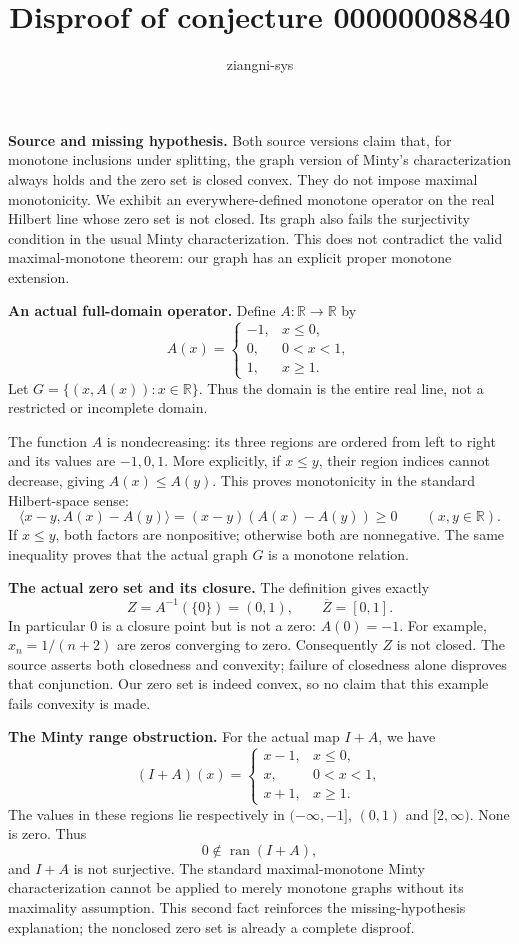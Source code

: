 \documentclass[11pt]{article}
\title{Disproof of conjecture 00000008840}
\author{ziangni-sys}
\date{}
\begin{document}
\maketitle
\noindent\textbf{Source and missing hypothesis.}
Both source versions claim that, for monotone inclusions under splitting, the graph version of Minty's characterization always holds and the zero set is closed convex. They do not impose maximal monotonicity. We exhibit an everywhere-defined monotone operator on the real Hilbert line whose zero set is not closed. Its graph also fails the surjectivity condition in the usual Minty characterization. This does not contradict the valid maximal-monotone theorem: our graph has an explicit proper monotone extension.

\medskip
\noindent\textbf{An actual full-domain operator.}
Define $A:\mathbb R\to\mathbb R$ by
\[
 A(x)=
 \begin{cases}
 -1,&x\le0,\\
 0,&0<x<1,\\
 1,&x\ge1.
 \end{cases}
\]
Let $G=\{(x,A(x)):x\in\mathbb R\}$. Thus the domain is the entire real line, not a restricted or incomplete domain.

The function $A$ is nondecreasing: its three regions are ordered from left to right and its values are $-1,0,1$. More explicitly, if $x\le y$, their region indices cannot decrease, giving $A(x)\le A(y)$. This proves monotonicity in the standard Hilbert-space sense:
\[
 \langle x-y,A(x)-A(y)\rangle
 =(x-y)(A(x)-A(y))\ge0
 \qquad(x,y\in\mathbb R).
\]
If $x\le y$, both factors are nonpositive; otherwise both are nonnegative. The same inequality proves that the actual graph $G$ is a monotone relation.

\medskip
\noindent\textbf{The actual zero set and its closure.}
The definition gives exactly
\[
 Z=A^{-1}(\{0\})=(0,1),\qquad \overline Z=[0,1].
\]
In particular $0$ is a closure point but is not a zero: $A(0)=-1$.
For example, $x_n=1/(n+2)$ are zeros converging to zero.
Consequently $Z$ is not closed. The source asserts both closedness and convexity; failure of closedness alone disproves that conjunction. Our zero set is indeed convex, so no claim that this example fails convexity is made.

\medskip
\noindent\textbf{The Minty range obstruction.}
For the actual map $I+A$, we have
\[
 (I+A)(x)=
 \begin{cases}
 x-1,&x\le0,\\
 x,&0<x<1,\\
 x+1,&x\ge1.
 \end{cases}
\]
The values in these regions lie respectively in $(-\infty,-1]$,
$(0,1)$ and $[2,\infty)$. None is zero. Thus
\[
 0\notin\operatorname{ran}(I+A),
\]
and $I+A$ is not surjective. The standard maximal-monotone Minty characterization cannot be applied to merely monotone graphs without its maximality assumption. This second fact reinforces the missing-hypothesis explanation; the nonclosed zero set is already a complete disproof.
\end{document}
